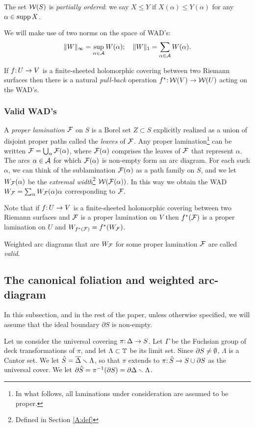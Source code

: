 The set ${\mathcal W}(S)$ is  {\it partially ordered}:
we say $X\leq Y$ if $X(\alpha)\leq Y(\alpha)$ for any $\alpha\in \operatorname{supp} X$.

We will make use of two norms on the space of WAD's:
$$
   \| W\|_\infty= \sup_{\alpha\in {\mathcal A}} W(\alpha); \quad \|W\|_1=\sum_{\alpha\in {\mathcal A}} W(\alpha).
$$

If $f\mathpunct: U\rightarrow V$ is a finite-sheeted  holomorphic covering between two Riemann surfaces
then there is a natural {\it pull-back} operation $f^*\mathpunct: {\mathcal W}(V)\rightarrow {\mathcal W}(U)$
acting on the WAD's.




\subsubsection{Valid WAD's} \label{subsubsec:valid}
A {\it proper lamination} ${\mathcal F}$ on $S$ is a Borel set $Z\subset S$
explicitly realized as a union of disjoint proper paths called the {\it leaves} of ${\mathcal F}$.
Any proper lamination\footnote{In what follows, all laminations under consideration are assumed to be proper.}
can be written ${\mathcal F} = \bigcup_\alpha {\mathcal F}(\alpha)$,
where ${\mathcal F}(\alpha)$ comprises the leaves of ${\mathcal F}$ that represent $\alpha$.
The arcs $\alpha\in {\mathcal A}$ for which ${\mathcal F}(\alpha)$ is non-empty form an arc diagram.
For each such $\alpha$,
we can think of the sublamination ${\mathcal F}(\alpha)$ as a path family on $S$,
and we let  $W_{\mathcal F}(\alpha)$ be the \emph{extremal width}\footnote{Defined in Section \ref{A:def}}
${\mathcal W}({\mathcal F}(\alpha))$.
In this way we obtain the WAD
$W_{\mathcal F} = \sum_\alpha W_{\mathcal F}(\alpha)\alpha$
corresponding to ${\mathcal F}$.

Note that if $f\mathpunct: U\rightarrow V$ is a finite-sheeted holomorphic covering between two Riemann surfaces
and ${\mathcal F}$ is a proper lamination on $V$ then $f^*({\mathcal F})$ is a proper lamination on $U$
and $W_{f^*({\mathcal F})} = f^* (W_{\mathcal F})$.

Weighted arc diagrams that are $W_{\mathcal F}$ for some proper lamination ${\mathcal F}$ are called {\it valid}.

\subsection{The canonical foliation and weighted arc-diagram}
\label{subsec:canonical}
In this subsection,
and in the rest of the paper,
unless otherwise specified,
we will assume that the ideal boundary $\partial S$ is non-empty. 

Let us consider the universal covering $\pi\mathpunct: \Delta\rightarrow S$.
Let $\Gamma$ be the Fuchsian group of deck transformations of $\pi$,
and let $\Lambda\subset {\Bbb T}$ be its limit set. Since $\di S \neq \emptyset$,
$\Lambda$ is a Cantor set. 
We let $\hat S = \overline{\Delta} \smallsetminus \Lambda$,
so that  $\pi$ extends to $\pi\mathpunct: \hat S \to S \cup \partial S$ as the universal cover. 
We let $\partial \hat S = \pi^{-1}(\partial S) = \partial \Delta \smallsetminus \Lambda$. 

